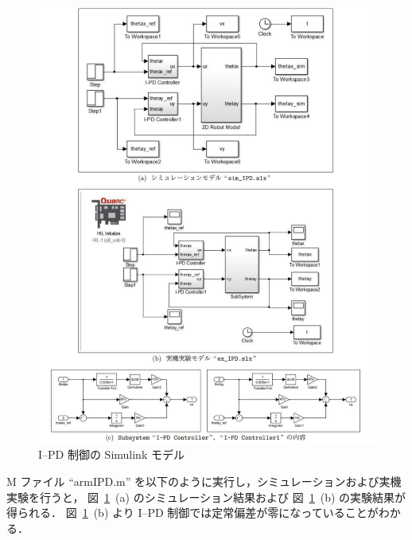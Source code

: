 \begin{figure}[H]
    \centering
    \includegraphics[width=0.95\linewidth]{figure/ipd_simulink_model.pdf}
    \caption{I--PD 制御の Simulink モデル}
    \label{fig:ipd_simulink}
\end{figure}

M ファイル ``armIPD.m'' を以下のように実行し，シミュレーションおよび実機実験を行うと，
図~\ref{fig:ipd_simulink}~(a) のシミュレーション結果および
図~\ref{fig:ipd_simulink}~(b) の実験結果が得られる．
図~\ref{fig:ipd_simulink}~(b) より I--PD 制御では定常偏差が零になっていることがわかる．

